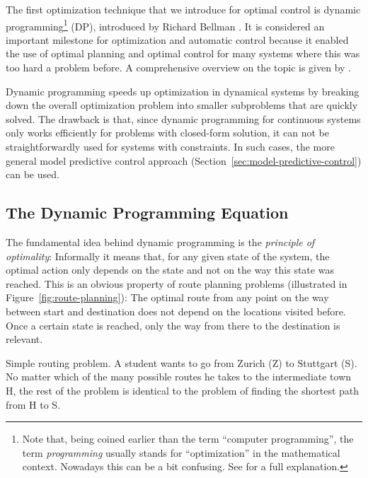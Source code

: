 The first optimization technique that we introduce for optimal control is
dynamic programming\footnote{Note that, being coined earlier than the term
``computer programming'', the term \emph{programming} usually stands for
``optimization'' in the mathematical context. Nowadays this can be a bit
confusing. See  for a full explanation.}
 (DP), introduced by Richard Bellman
\cite{Bellman:1957:Dynamic}. It is considered an important milestone for
optimization and automatic control because it enabled the use of optimal
planning and optimal control for many systems where this was too hard a problem
before. A comprehensive overview on the topic is given by
\textcite{Bertsekas:2005:Dynamic}.

Dynamic programming speeds up optimization in dynamical systems by breaking down
the overall optimization problem into smaller subproblems that are quickly
solved. The drawback is that, since dynamic programming for continuous
systems only works efficiently for problems with closed-form solution, it
can not be straightforwardly used for systems with constraints. In such cases,
the more general model predictive control approach
(Section~\ref{sec:model-predictive-control}) can be used.

\subsection{The Dynamic Programming Equation}
\label{sec:bellmans-equation}

The fundamental idea behind dynamic programming is the \emph{principle of
optimality}: Informally it means that, for any given state of the system, the
optimal action only depends on the state and not on the way this state
was reached. This is an obvious property of route planning problems (illustrated
in Figure~\ref{fig:route-planning}): The optimal route from any point on the way
between start and destination does not depend on the locations visited before.
Once a certain state is reached, only the way from there to the destination is
relevant.

\begin{marginfigure}
  \caption[Simple routing problem.]{Simple routing problem. A student wants
to go from Zurich (Z) to Stuttgart (S). No matter which of the many possible
routes he takes to the intermediate town H, the rest of the problem is identical
to the problem of finding the shortest path from H to S.}
  \label{fig:route-planning}
\end{marginfigure}

